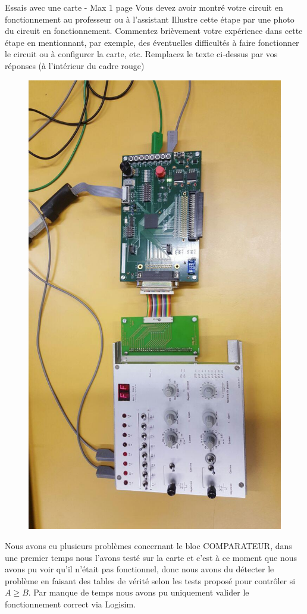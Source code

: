\documentclass[a4paper]{article}
\begin{document}
\begin{tcolorbox}[colframe=Monokaimagenta,colback=white]
Essais avec une carte - Max 1 page 
Vous devez avoir montré votre circuit en fonctionnement au professeur ou à l’assistant
Illustre cette étape par une photo du circuit en fonctionnement.
Commentez brièvement votre expérience dans cette étape en mentionnant, par exemple, des éventuelles difficultés à faire fonctionner le circuit ou à configurer la carte, etc.
Remplacez le texte ci-dessus par vos réponses (à l’intérieur du cadre rouge)

\begin{figure}[H]
    \centering
    \includegraphics[width=.5\textwidth]{src/alu_carte.jpg}
    \label{fig:ISZERO}
\end{figure}

Nous avons eu plusieurs problèmes concernant le bloc COMPARATEUR, dans une premier temps nous l'avons testé sur la carte et c'est à ce moment que nous avons pu voir qu'il n'était pas fonctionnel, donc nous avons du détecter le problème en faisant des tables de vérité selon les tests proposé pour contrôler si $A \ge B$. Par manque de temps nous avons pu uniquement valider le fonctionnement correct via Logisim.
\end{tcolorbox}
\end{document}
